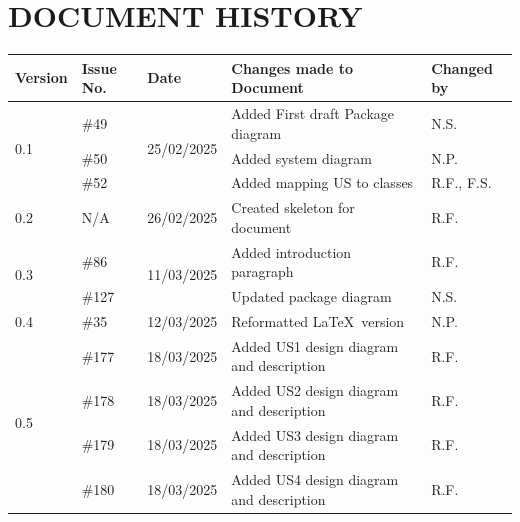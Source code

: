 \documentclass[a4paper]{project}
\begin{document}
	
	\section*{DOCUMENT HISTORY}
	
		\begin{center}
			\begin{tabular}{|l|l|l|l|l|}
				\hline
				Version               & Issue No. & Date                        & Changes made to Document                  & Changed by             \\ \hline
				\multirow{3}{*}{0.1}  & \#49      & \multirow{3}{*}{25/02/2025} & Added First draft Package diagram         & N.S.                   \\
				                      & \#50      &                             & Added system diagram                      & N.P.                   \\
				                      & \#52      &                             & Added mapping US to classes               & R.F., F.S.             \\ \hline
				0.2                   & N/A       & 26/02/2025                  & Created skeleton for document             & R.F.                   \\ \hline
				\multirow{2}{*}{0.3}  & \#86      & \multirow{2}{*}{11/03/2025} & Added introduction paragraph              & R.F.                   \\
				                      & \#127     &                             & Updated package diagram                   & N.S.                   \\ \hline
				0.4                   & \#35      & 12/03/2025                  & Reformatted \LaTeX\ version               & N.P.                   \\ \hline
				\multirow{9}{*}{0.5}  & \#177     & 18/03/2025                  & Added US1 design diagram and description  & R.F.                   \\
				                      & \#178     & 18/03/2025                  & Added US2 design diagram and description  & R.F.                   \\
				                      & \#179     & 18/03/2025                  & Added US3 design diagram and description  & R.F.                   \\
				                      & \#180     & 18/03/2025                  & Added US4 design diagram and description  & R.F.                   \\

\end{tabular}
\end{center}
\end{document}
